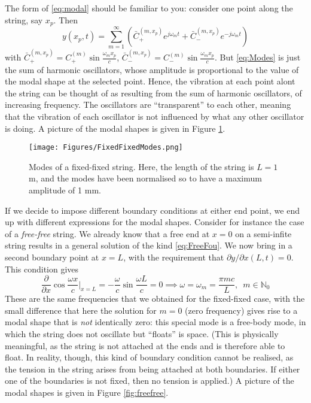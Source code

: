 \noindent
The form of \eqref{eq:modal} should be familiar to you: consider one point along the string, say $x_p$. Then
\begin{equation}\label{eq:Modes}
y(x_p,t) = \sum_{m=1}^{\infty } \left( \bar C_+^{(m,x_p)} e^{j \omega_m t} +  \bar C_-^{(m,x_p)}  e^{-j \omega_m t} \right)
\end{equation}
with $\bar C_+^{(m,x_p)} = C_+^{(m)} \sin \frac{\omega_m x_p}{c}$, $\bar C_-^{(m,x_p)} = C_-^{(m)} \sin \frac{\omega_m x_p}{c}$. But \eqref{eq:Modes} is just the sum of harmonic oscillators, whose amplitude is proportional to the value of the modal shape at the selected point. Hence, the vibration at each point alont the string can be thought of as resulting from the sum of harmonic oscillators, of increasing frequency. The oscillators are ``transparent'' to each other, meaning that the vibration of each oscillator is not influenced by what any other oscillator is doing. A picture of the modal shapes is given in Figure \ref{fig:fixfix}.
\begin{figure}[hbt]
\texttt{[image: Figures/FixedFixedModes.png]}
\caption{Modes of a fixed-fixed string. Here, the length of the string is $L =1$ m, and the modes have been normalised so to have a maximum amplitude of 1 mm.}\label{fig:fixfix}
\end{figure}

\medskip \medskip 

\noindent
If we decide to impose different boundary conditions at either end point, we end up with different expressions for the modal shapes. Consider for instance the case of a \emph{free-free} string. We already know that a free end at $x=0$ on a semi-infite string results in a general solution of the kind \eqref{eq:FreeFou}. We now bring in a second boundary point at $x=L$, with the requirement that $\partial y / \partial x (L,t) = 0$. This condition gives
\begin{equation}
\frac{\partial}{\partial x}\cos\frac{\omega x}{c}\Bigg|_{x=L} = - \frac{\omega}{c} \sin \frac{\omega L}{c} = 0 \implies \omega = \omega_m = \frac{\pi m c}{L}, \,\,\, m \in \mathbb{N}_0
\end{equation}
These are the same frequencies that we obtained for the fixed-fixed case, with the small difference that here the solution for $m=0$ (zero frequency) gives rise to a modal shape that is \emph{not} identically zero: this special mode is a free-body mode, in which the string does not oscillate but ``floats'' is space. (This is physically meaningful, as the string is not attached at the ends and is therefore able to float. In reality, though, this kind of boundary condition cannot be realised, as the tension in the string arises from being attached at both boundaries. If either one of the boundaries is not fixed, then no tension is applied.) A picture of the modal shapes is given in Figure \ref{fig:freefree}.



